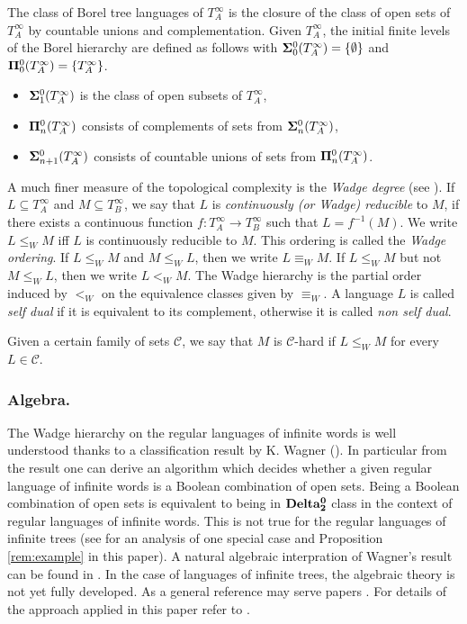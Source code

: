 The class of Borel tree languages of $T^\infty_A$ is the
closure of the class of open sets of $T^\infty_A$ by countable unions and
complementation. Given $T^\infty_A$, the initial finite levels of the
Borel hierarchy are defined as follows with ${\bf\Sigma}^0_0(T^\infty_A)= \{\emptyset\}$ and
${\bf\Pi}^0_0(T^\infty_A)=\{T^\infty_A \}$.
\begin{itemize}
\item ${\bf\Sigma}^0_1(T^\infty_A)$ is the class of open subsets of $T^\infty_A$, 
\item ${\bf\Pi}^0_n(T^\infty_A)$ consists of complements of sets from ${\bf\Sigma}^0_n(T^\infty_A)$, 
\item ${\bf\Sigma}^0_{n+1}(T^\infty_A)$ consists of countable unions of sets from ${\bf\Pi}^0_n(T^\infty_A)$. 
\end{itemize}

A much finer measure of the topological complexity is the \emph{Wadge degree} (see \cite[Chapter 21.E]{kechris}).
If $L \subseteq T^\infty_A$ and $M\subseteq T^\infty_B$, we say that $L$ is \emph{continuously (or Wadge)
reducible} to $M$, if there exists a continuous function $f: T^\infty_A \to T^\infty_B$ such that $L=
f^{-1}(M)$. We write $L \leq_W M$ iff $L$ is continuously reducible to $M$.
This ordering is called the {\em Wadge ordering}. If $L \leq_W M$ and $M \leq_W L$, then we write $L
\equiv_W M$. If $L \leq_W M$ but not $M \leq_W L$, then we write $L<_W
M$. The Wadge hierarchy is the partial order induced by $<_W$ on the
equivalence classes given by $\equiv_W$. A language  $L$ is called {\em self dual} if it is equivalent 
to its complement, otherwise it is called {\em non self dual}.

Given a certain family of sets $\mathcal{C}$, we say that $M$ is $\mathcal{C}$-hard if $L
\leq_W M$ for every $L \in \mathcal{C}$.   

\subsubsection*{Algebra.}
The Wadge hierarchy on the regular languages of infinite words is well understood thanks to a classification result by K. Wagner (\cite{wagner}). In particular from the result one can derive an algorithm which decides whether a given regular language of infinite words is a Boolean combination of open sets. Being a Boolean combination of open sets is equivalent to being in ${\bf Delta^0_2}$ class in the context of regular languages of infinite words. This is not true for the regular languages of infinite trees (see \cite[Section 4.1]{bp} for an analysis of one special case and Proposition \ref{rem:example} in this paper).   
A natural algebraic interpration of Wagner's result can be found in \cite[Theorem V.6.2]{pinperrin}. In the case of languages of infinite trees, the algebraic theory is not yet fully developed. As a general reference may serve papers \cite{blumensath,bp,bojtrees,bojidziaszek}. For details of the approach applied in this paper refer to \cite[Section 3]{bp}. 

